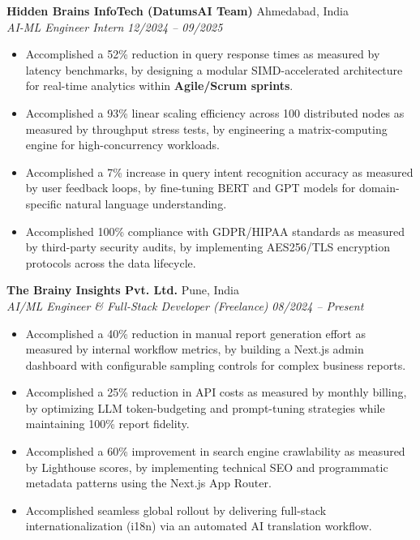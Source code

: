 \documentclass[10pt, a4paper]{article}
\newcommand{\entry}[4]{
  \noindent \textbf{#1} \hfill #2 \\
  \textit{#3} \hfill \textit{#4} \par
  \vspace{2pt}
}
\begin{document}
\entry{Hidden Brains InfoTech (DatumsAI Team)}{Ahmedabad, India}{AI-ML Engineer Intern}{12/2024 -- 09/2025}
\begin{itemize}[leftmargin=1.5em, noitemsep]
    \item Accomplished a 52\% reduction in query response times as measured by latency benchmarks, by designing a modular SIMD-accelerated architecture for real-time analytics within \textbf{Agile/Scrum sprints}.
    \item Accomplished a 93\% linear scaling efficiency across 100 distributed nodes as measured by throughput stress tests, by engineering a matrix-computing engine for high-concurrency workloads.
    \item Accomplished a 7\% increase in query intent recognition accuracy as measured by user feedback loops, by fine-tuning BERT and GPT models for domain-specific natural language understanding.
    \item Accomplished 100\% compliance with GDPR/HIPAA standards as measured by third-party security audits, by implementing AES256/TLS encryption protocols across the data lifecycle.
\end{itemize}

\entry{The Brainy Insights Pvt. Ltd.}{Pune, India}{AI/ML Engineer \& Full-Stack Developer (Freelance)}{08/2024 -- Present}
\begin{itemize}[leftmargin=1.5em, noitemsep]
    \item Accomplished a 40\% reduction in manual report generation effort as measured by internal workflow metrics, by building a Next.js admin dashboard with configurable sampling controls for complex business reports.
    \item Accomplished a 25\% reduction in API costs as measured by monthly billing, by optimizing LLM token-budgeting and prompt-tuning strategies while maintaining 100\% report fidelity.
    \item Accomplished a 60\% improvement in search engine crawlability as measured by Lighthouse scores, by implementing technical SEO and programmatic metadata patterns using the Next.js App Router.
    \item Accomplished seamless global rollout by delivering full-stack internationalization (i18n) via an automated AI translation workflow.
\end{itemize}
\end{document}
